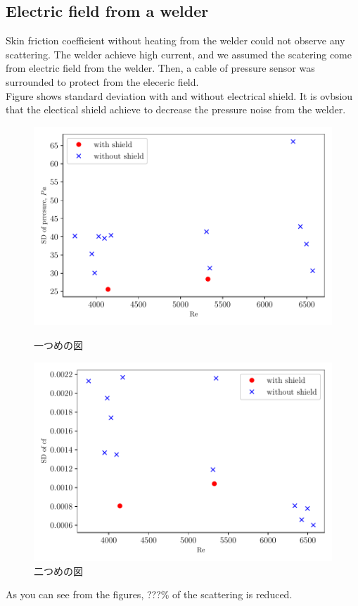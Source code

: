 \documentclass[12pt,oneside]{jbook}
\begin{document}
\subsection{Electric field from a welder}
Skin friction coefficient without heating from the welder could not observe any scattering.
The welder achieve high current, and we assumed the scatering come from electric field from the welder.
Then, a cable of pressure sensor was surrounded to protect from the eleceric field.\\
Figure shows standard deviation with and without electrical shield.
It is ovbsiou that the electical shield achieve to decrease the pressure noise from the welder.
\begin{figure}[t]
    \begin{minipage}{0.5\hsize}
        \begin{center}
            \includegraphics[width=1\linewidth]{fig/SD_shield4prresure.pdf}
        \end{center}
        \caption{一つめの図}
        \label{fig:one}
    \end{minipage}
    \begin{minipage}{0.5\hsize}
        \begin{center}
            \includegraphics[width=1\linewidth]{fig/SD_shield4cf.pdf}
        \end{center}
        \caption{二つめの図}
        \label{fig:two}
    \end{minipage}
\end{figure}
As you can see from the figures, ???$\%$ of the scattering is reduced.
\end{document}
